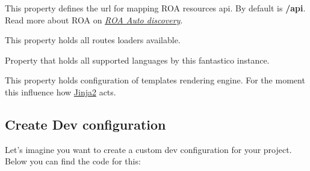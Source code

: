 \documentclass[letterpaper,10pt,english]{sphinxmanual}
\begin{document}
\begin{fulllineitems}
\begin{fulllineitems}
\end{fulllineitems}


\begin{fulllineitems}
\label{get_started/settings:fantastico.settings.BasicSettings.roa_api}
This property defines the url for mapping ROA resources api. By default is \textbf{/api}. Read more about ROA on
{\hyperref[features/components/roa_discovery/roa_discovery::doc]{\emph{ROA Auto discovery}}}.

\end{fulllineitems}


\begin{fulllineitems}
\label{get_started/settings:fantastico.settings.BasicSettings.routes_loaders}
This property holds all routes loaders available.

\end{fulllineitems}


\begin{fulllineitems}
\label{get_started/settings:fantastico.settings.BasicSettings.supported_languages}
Property that holds all supported languages by this fantastico instance.

\end{fulllineitems}


\begin{fulllineitems}
\label{get_started/settings:fantastico.settings.BasicSettings.templates_config}
This property holds configuration of templates rendering engine. For the moment this influence how
\href{http://jinja.pocoo.org/docs/}{Jinja2} acts.

\end{fulllineitems}


\end{fulllineitems}



\subsection{Create Dev configuration}
\label{get_started/settings:create-dev-configuration}
Let's imagine you want to create a custom dev configuration for your project. Below you can find the code for this:
\end{document}
